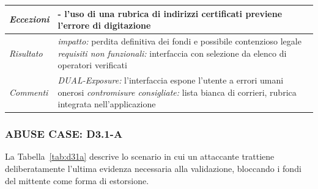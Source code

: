 \begin{longtable}{| >{\columncolor{misuseCol}}p{} | p{} |}
\hline
\textit{Eccezioni} & - l'uso di una rubrica di indirizzi certificati previene l'errore di digitazione \\
\hline
\textit{Risultato} & \textit{impatto:} perdita definitiva dei fondi e possibile contenzioso legale \newline \textit{requisiti non funzionali:} interfaccia con selezione da elenco di operatori verificati \\
\hline
\textit{Commenti} & \textit{DUAL-Exposure:} l'interfaccia espone l'utente a errori umani onerosi \newline \textit{contromisure consigliate:} lista bianca di corrieri, rubrica integrata nell'applicazione \\
\hline
\end{longtable}

\subsubsection*{ABUSE CASE: D3.1-A}
La Tabella~\ref{tab:d31a} descrive lo scenario in cui un attaccante trattiene deliberatamente l'ultima evidenza necessaria alla validazione, bloccando i fondi del mittente come forma di estorsione.
